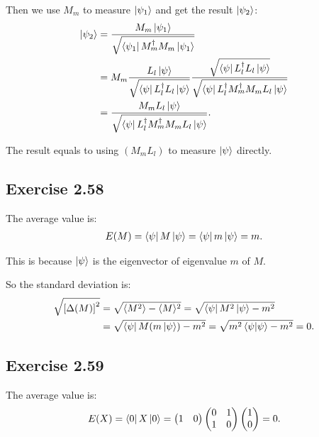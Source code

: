 Then we use $M_m$ to measure $\ket{\psi_1}$ and get the result $\ket{\psi_2}$:
\begin{align}
\ket{\psi_2}&=\frac{M_m\ket{\psi_1}}{\sqrt{\bra{\psi_1}M_m^\dagger M_m\ket{\psi_1}}}\\
&=M_m\frac{L_l\ket{\psi}}{\sqrt{\bra{\psi}L_l^\dagger L_l\ket{\psi}}}\frac{\sqrt{\bra{\psi}L_l^\dagger L_l\ket{\psi}}}{\sqrt{\bra{\psi}L_l^\dagger M_m^\dagger M_m L_l\ket{\psi}}}\\
&=\frac{M_m L_l\ket{\psi}}{\sqrt{\bra{\psi}L_l^\dagger M_m^\dagger M_m L_l\ket{\psi}}}.
\end{align}

The result equals to using $(M_mL_l)$ to measure $\ket{\psi}$ directly.

\subsection*{Exercise 2.58}

The average value is:
\begin{align}
E(M)=\bra{\psi}M\ket{\psi}=\bra{\psi}m\ket{\psi}=m.
\end{align}

This is because $\ket{\psi}$ is the eigenvector of eigenvalue $m$ of $M$.

So the standard deviation is:
\begin{align}
\sqrt{\left[\Delta (M)\right]^2} &= \sqrt{\langle M^2\rangle-\langle M\rangle^2}=\sqrt{\bra{\psi}M^2\ket{\psi}-m^2}\\
&=\sqrt{\bra{\psi}M(m\ket{\psi})-m^2}= \sqrt{m^2\bra{\psi}\ket{\psi}-m^2}=0.
\end{align}

\subsection*{Exercise 2.59}

The average value is:
\begin{align}
E(X)=\bra{0}X\ket{0}=
\begin{pmatrix}
1& 0
\end{pmatrix}
\begin{pmatrix}
0 & 1 \\ 1 & 0
\end{pmatrix}
\begin{pmatrix}
1\\0
\end{pmatrix}=0
.
\end{align}

